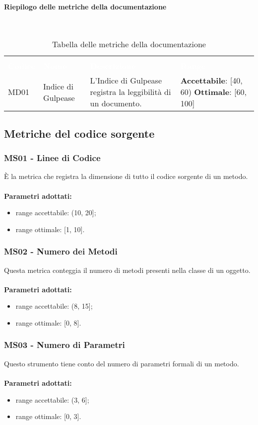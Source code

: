 \paragraph*{Riepilogo delle metriche della documentazione} \mbox{} \\ 
\begin{longtable}{C{3cm} C{4cm} L{4cm} C{3cm}}
\caption{Tabella delle metriche della documentazione}\\
	\textcolor{white}{\textbf{Codice}} &
	\textcolor{white}{\textbf{Nome}} &
	\textcolor{white}{\textbf{Descrizione}} &
	\textcolor{white}{\textbf{Range}} \\
MD01 &
Indice di Gulpease &
L'Indice di Gulpease registra la leggibilità di un documento. &
\textbf{Accettabile}: [40, 60)
\textbf{Ottimale}: [60, 100] \\
\end{longtable}

\subsection{Metriche del codice sorgente}
\subsubsection{MS01 - Linee di Codice}
È la metrica che registra la dimensione di tutto il codice sorgente di un metodo.\\ \\
\textbf{Parametri adottati:}
\begin{itemize}
\item range accettabile: (10, 20];
\item range ottimale: [1, 10].
\end{itemize}
\subsubsection{MS02 - Numero dei Metodi}
Questa metrica conteggia il numero di metodi presenti nella classe di un oggetto.\\ \\ 
\textbf{Parametri adottati:} 
\begin{itemize}
\item range accettabile: (8, 15];
\item range ottimale: [0, 8].
\end{itemize}
\subsubsection{MS03 - Numero di Parametri}
Questo strumento tiene conto del numero di parametri formali di un metodo.\\ \\ 
\textbf{Parametri adottati:} 
\begin{itemize}
\item range accettabile: (3, 6];
\item range ottimale: [0, 3].
\end{itemize}
